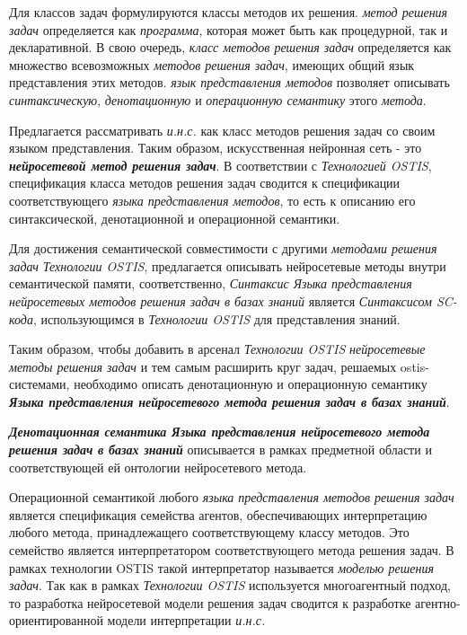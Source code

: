 Для классов задач формулируются классы методов их решения. \textit{метод решения задач} определяется как \textit{программа}, которая может быть как процедурной, так и декларативной. В свою очередь, \textit{класс методов решения задач} определяется как множество всевозможных \textit{методов решения задач}, имеющих общий язык представления этих методов. \textit{язык представления методов} позволяет описывать \textit{синтаксическую}, \textit{денотационную} и \textit{операционную семантику} этого \textit{метода}.

Предлагается рассматривать \textit{и.н.с.} как класс методов решения задач со своим языком представления. Таким образом, искусственная нейронная сеть - это \textbf{\textit{нейросетевой метод решения задач}}. В соответствии с \textit{Технологией OSTIS}, спецификация класса методов решения задач сводится к спецификации соответствующего \textit{языка представления методов}, то есть к описанию его синтаксической, денотационной и операционной семантики.

Для достижения семантической совместимости с другими \textit{методами решения задач} \textit{Технологии OSTIS}, предлагается описывать нейросетевые методы внутри семантической памяти, соответственно, \textit{Синтаксис Языка представления \textit{нейросетевых методов решения задач в базах знаний}} является \textit{Синтаксисом SC-кода}, использующимся в \textit{Технологии OSTIS} для представления знаний.

Таким образом, чтобы добавить в арсенал \textit{Технологии OSTIS} \textit{нейросетевые методы решения задач} и тем самым расширить круг задач, решаемых ostis-системами, необходимо описать денотационную и операционную семантику \textbf{\textit{Языка представления нейросетевого метода решения задач в базах знаний}}.

\textbf{\textit{Денотационная семантика Языка представления нейросетевого метода решения задач в базах знаний}} описывается в рамках предметной области и соответствующей ей онтологии нейросетевого метода.

Операционной семантикой любого \textit{языка представления методов решения задач} является спецификация семейства агентов, обеспечивающих интерпретацию любого метода, принадлежащего соответствующему классу методов. Это семейство является интерпретатором соответствующего метода решения задач. В рамках технологии OSTIS такой интерпретатор называется \textit{моделью решения задач}. Так как в рамках \textit{Технологии OSTIS} используется многоагентный подход, то разработка нейросетевой модели решения задач сводится к разработке агентно-ориентированной модели интерпретации \textit{и.н.с.}

